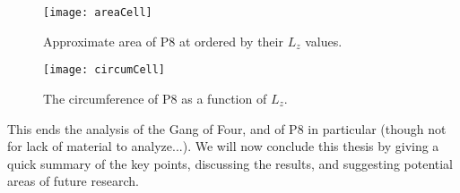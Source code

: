 \begin{figure}[h!]
\texttt{[image: areaCell]}
\caption{Approximate area of P8 at ordered by their $L_z$ values.}\label{fig:areaCell}
\end{figure}

\begin{figure}[h!]
\texttt{[image: circumCell]}
\caption{The circumference of P8 as a function of $L_z$.}\label{fig:circumCell}
\end{figure}

\clearpage 
This ends the analysis of the Gang of Four, and of P8 in particular (though not for lack of material to analyze...). We will now conclude this thesis by giving a quick summary of the key points, discussing the results, and suggesting potential areas of future research. 